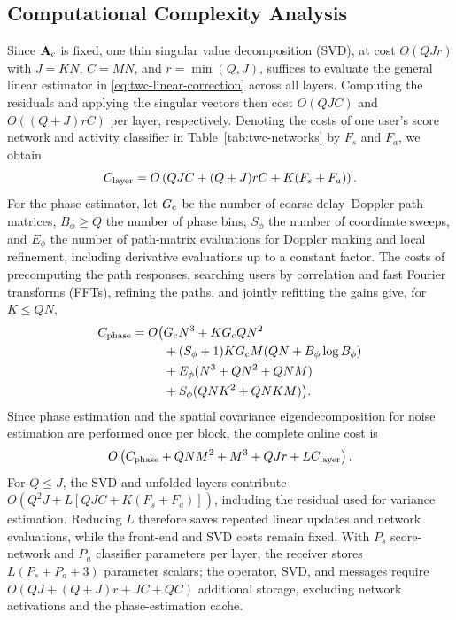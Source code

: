 \subsection{Computational Complexity Analysis}

Since $\mathbf A_{\rm c}$ is fixed, one thin singular value decomposition
(SVD), at cost $O(QJr)$ with $J=KN$, $C=MN$, and $r=\min(Q,J)$,
suffices to evaluate the general linear estimator in
\eqref{eq:twc-linear-correction} across all layers. Computing the
residuals and applying the singular vectors then cost $O(QJC)$ and
$O((Q+J)rC)$ per layer, respectively. Denoting the costs of one user's
score network and activity classifier in Table~\ref{tab:twc-networks}
by $F_s$ and $F_a$, we obtain
\begin{equation}
 C_{\rm layer}=O\left(QJC+(Q+J)rC+K(F_s+F_a)\right).
 \label{eq:twc-layer-complexity}
\end{equation}
For the phase estimator, let $G_{\rm c}$ be the number of coarse
delay--Doppler path matrices, $B_\phi\geq Q$ the number of phase bins,
$S_\phi$ the number of coordinate sweeps, and $E_\phi$ the number of
path-matrix evaluations for Doppler ranking and local refinement,
including derivative evaluations up to a constant factor. The costs
of precomputing the path responses, searching users by correlation and
fast Fourier transforms (FFTs), refining the paths, and jointly
refitting the gains give, for $K\leq QN$,
\begin{equation}
 \begin{aligned}
 C_{\rm phase}=O\big(&G_{\rm c}N^3+KG_{\rm c}QN^2\\
 &+(S_\phi+1)KG_{\rm c}M(QN+B_\phi\log B_\phi)\\
 &+E_\phi(N^3+QN^2+QNM)\\
 &+S_\phi(QNK^2+QNKM)\big).
 \end{aligned}
 \label{eq:twc-phase-complexity}
\end{equation}
Since phase estimation and the spatial covariance eigendecomposition
for noise estimation are performed once per block, the complete
online cost is
\begin{equation}
 O\left(C_{\rm phase}+QNM^2+M^3+QJr+L C_{\rm layer}\right).
 \label{eq:twc-complexity}
\end{equation}
For $Q\leq J$, the SVD and unfolded layers contribute
$O(Q^2J+L[QJC+K(F_s+F_a)])$, including the residual used for
variance estimation. Reducing $L$ therefore saves repeated linear
updates and network evaluations, while the front-end and SVD costs
remain fixed. With $P_s$ score-network and $P_a$ classifier parameters
per layer, the receiver stores $L(P_s+P_a+3)$ parameter scalars;
the operator, SVD, and messages require
$O(QJ+(Q+J)r+JC+QC)$ additional storage, excluding network activations
and the phase-estimation cache.
